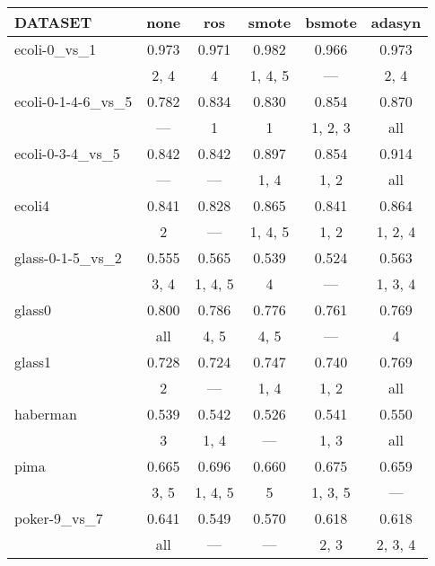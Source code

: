 \begin{tabular}{lccccc}
\hline
 DATASET                    & none    & ros     & smote   & bsmote   & adasyn   \\
\hline
 ecoli-0\_vs\_1               & 0.973   & 0.971   & 0.982   & 0.966    & 0.973    \\
                            & 2, 4    & 4       & 1, 4, 5 & ---      & 2, 4     \\
 ecoli-0-1-4-6\_vs\_5         & 0.782   & 0.834   & 0.830   & 0.854    & 0.870    \\
                            & ---     & 1       & 1       & 1, 2, 3  & all      \\
 ecoli-0-3-4\_vs\_5           & 0.842   & 0.842   & 0.897   & 0.854    & 0.914    \\
                            & ---     & ---     & 1, 4    & 1, 2     & all      \\
 ecoli4                     & 0.841   & 0.828   & 0.865   & 0.841    & 0.864    \\
                            & 2       & ---     & 1, 4, 5 & 1, 2     & 1, 2, 4  \\
 glass-0-1-5\_vs\_2           & 0.555   & 0.565   & 0.539   & 0.524    & 0.563    \\
                            & 3, 4    & 1, 4, 5 & 4       & ---      & 1, 3, 4  \\
 glass0                     & 0.800   & 0.786   & 0.776   & 0.761    & 0.769    \\
                            & all     & 4, 5    & 4, 5    & ---      & 4        \\
 glass1                     & 0.728   & 0.724   & 0.747   & 0.740    & 0.769    \\
                            & 2       & ---     & 1, 4    & 1, 2     & all      \\
 haberman                   & 0.539   & 0.542   & 0.526   & 0.541    & 0.550    \\
                            & 3       & 1, 4    & ---     & 1, 3     & all      \\
 pima                       & 0.665   & 0.696   & 0.660   & 0.675    & 0.659    \\
                            & 3, 5    & 1, 4, 5 & 5       & 1, 3, 5  & ---      \\
 poker-9\_vs\_7               & 0.641   & 0.549   & 0.570   & 0.618    & 0.618    \\
                            & all     & ---     & ---     & 2, 3     & 2, 3, 4  \\

\end{tabular}
